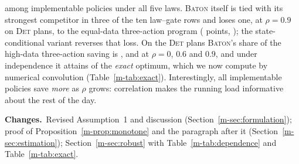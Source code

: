 \documentclass[11pt]{article}
\newcommand{\chg}{\par\noindent\textbf{Changes.}\ }
\newcommand{\sref}[1]{Section~\ref{m-#1}}
\newcommand{\tref}[1]{Table~\ref{m-#1}}
\newcommand{\BATON}{\textsc{Baton}}
\begin{document}
among implementable policies under all five laws. \BATON{} itself is
tied with its strongest competitor in three of the ten law--gate rows and
loses one, at $\rho = 0.9$ on \textsc{Det} plans, to the equal-data
three-action program (\depRhoNineDetDelta{} points,
\depRhoNineDetDeltaCI); the state-conditional variant reverses that
loss. On the \textsc{Det} plans \BATON's share of the high-data
three-action saving is \depRhoZeroDetRatio, \depRhoSixDetRatio{} and
\depRhoNineDetRatio{} at $\rho = 0$, $0.6$ and $0.9$, and under
independence it attains \exDetShare{} of the \emph{exact} optimum,
which we now compute by numerical convolution (\tref{tab:exact}).
Interestingly, all implementable policies save \emph{more} as $\rho$ grows:
correlation makes the running load informative about the rest of the
day.
\chg Revised Assumption~1 and discussion (\sref{sec:formulation}); proof
of Proposition~\ref{m-prop:monotone} and the paragraph after it
(\sref{sec:estimation}); \sref{sec:robust} with \tref{tab:dependence}
and \tref{tab:exact}.
\end{document}
